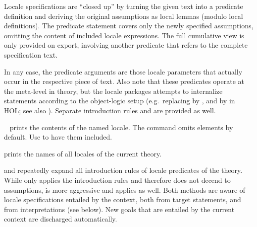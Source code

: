 \begin{isabellebody}
\begin{isamarkuptext}
\begin{description}
  \medskip Locale specifications are ``closed up'' by
  turning the given text into a predicate definition  and deriving the original assumptions as local lemmas
  (modulo local definitions).  The predicate statement covers only the
  newly specified assumptions, omitting the content of included locale
  expressions.  The full cumulative view is only provided on export,
  involving another predicate  that refers to the complete
  specification text.
  
  In any case, the predicate arguments are those locale parameters
  that actually occur in the respective piece of text.  Also note that
  these predicates operate at the meta-level in theory, but the locale
  packages attempts to internalize statements according to the
  object-logic setup (e.g.\ replacing \isa{{\isasymAnd}} by \isa{{\isasymforall}}, and
  \isa{{\isachardoublequote}{\isasymLongrightarrow}{\isachardoublequote}} by \isa{{\isachardoublequote}{\isasymlongrightarrow}{\isachardoublequote}} in HOL; see also
  ).  Separate introduction rules  and  are provided as well.
  
  \item \hyperlink{command.print-locale}{\mbox{}}~ prints the
  contents of the named locale.  The command omits \hyperlink{element.notes}{\mbox{}}
  elements by default.  Use \hyperlink{command.print-locale}{\mbox{}}\isa{{\isachardoublequote}{\isacharbang}{\isachardoublequote}} to
  have them included.

  \item \hyperlink{command.print-locales}{\mbox{}} prints the names of all locales
  of the current theory.

  \item \hyperlink{method.intro-locales}{\mbox{}} and \hyperlink{method.unfold-locales}{\mbox{}}
  repeatedly expand all introduction rules of locale predicates of the
  theory.  While \hyperlink{method.intro-locales}{\mbox{}} only applies the  introduction rules and therefore does not decend to
  assumptions, \hyperlink{method.unfold-locales}{\mbox{}} is more aggressive and applies
   as well.  Both methods are aware of locale
  specifications entailed by the context, both from target statements,
  and from interpretations (see below).  New goals that are entailed
  by the current context are discharged automatically.


\end{description}
\end{isamarkuptext}
\end{isabellebody}
